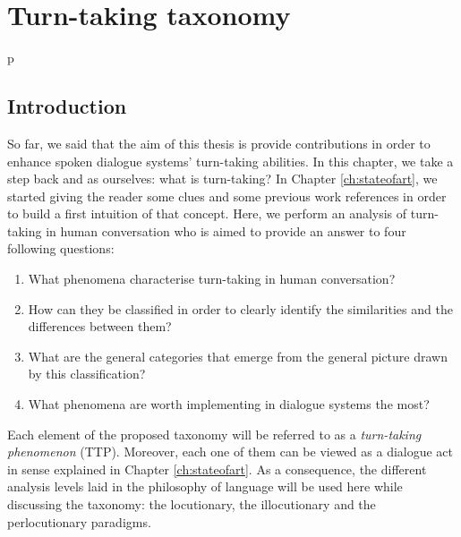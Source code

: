 \chapter{Turn-taking taxonomy}p
\label{ch:taxonomy}



\section{Introduction}

        So far, we said that the aim of this thesis is provide contributions in order to enhance spoken dialogue systems' turn-taking abilities. In this chapter, we take a step back and as ourselves: what is turn-taking? In Chapter \ref{ch:stateofart}, we started giving the reader some clues and some previous work references in order to build a first intuition of that concept. Here, we perform an analysis of turn-taking in human conversation who is aimed to provide an answer to four following questions:

        \begin{enumerate}
          \item What phenomena characterise turn-taking in human conversation?
          \item How can they be classified in order to clearly identify the similarities and the differences between them?
          \item What are the general categories that emerge from the general picture drawn by this classification?
          \item What phenomena are worth implementing in dialogue systems the most?
        \end{enumerate}

        Each element of the proposed taxonomy will be referred to as a \textit{turn-taking phenomenon} (TTP). Moreover, each one of them can be viewed as a dialogue act in sense explained in Chapter \ref{ch:stateofart}. As a consequence, the different analysis levels laid in the philosophy of language will be used here while discussing the taxonomy: the locutionary, the illocutionary and the perlocutionary paradigms.

